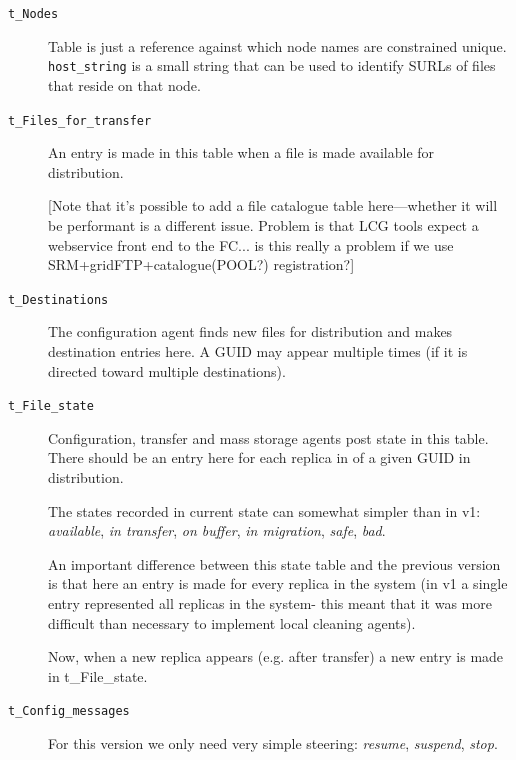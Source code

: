 \documentclass{cmspaper}
\begin{document}
\begin{description}
  \item [\texttt{t\_Nodes}]\mbox{}

    Table is just a reference against which node names are constrained
    unique.  \verb|host_string| is a small string that can be used to
    identify SURLs of files that reside on that node.

  \item [\texttt{t\_Files\_for\_transfer}]\mbox{}

    An entry is made in this table when a file is made available
    for distribution.

    [Note that it's possible to add a file catalogue table
    here---whether it will be performant is a different issue.
    Problem is that LCG tools expect a webservice front end to the
    FC... is this really a problem if we use
    SRM+gridFTP+catalogue(POOL?) registration?]

  \item [\texttt{t\_Destinations}]\mbox{}

    The configuration agent finds new files for distribution and makes
    destination entries here.  A GUID may appear multiple times (if it
    is directed toward multiple destinations).

  \item [\texttt{t\_File\_state}]\mbox{}

    Configuration, transfer and mass storage agents post state in this
    table. There should be an entry here for each replica in of a
    given GUID in distribution.

    The states recorded in current state can somewhat simpler than in
    v1: {\em available}, {\em in transfer}, {\em on buffer},
    {\em in migration}, {\em safe}, {\em bad}.

    An important difference between this state table and the previous
    version is that here an entry is made for every replica in the
    system (in v1 a single entry represented all replicas in the system-
    this meant that it was more difficult than necessary to implement
    local cleaning agents).
    
    Now, when a new replica appears (e.g. after transfer) a new entry
    is made in t\_File\_state.

  \item [\texttt{t\_Config\_messages}]\mbox{}

    For this version we only need very simple steering: {\em resume},
    {\em suspend}, {\em stop}.


\end{description}
\end{document}
